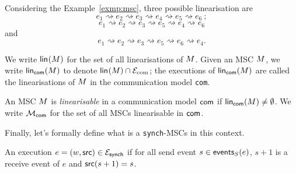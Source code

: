 

\bigskip

\begin{example}\label{exmp:lin}
Considering the Example~\ref{exmp:msc}, three possible linearisation
are 
$$e_1 \rightsquigarrow e_2 \rightsquigarrow e_3 \rightsquigarrow e_4
\rightsquigarrow e_5 \rightsquigarrow e_6\ ;$$
$$e_1 \rightsquigarrow e_2 \rightsquigarrow e_3 \rightsquigarrow e_5
\rightsquigarrow e_4 \rightsquigarrow e_6$$ and
$$e_1 \rightsquigarrow e_2 \rightsquigarrow e_3 \rightsquigarrow e_5
\rightsquigarrow e_6 \rightsquigarrow e_4.$$ 
\end{example}

We write $\mathsf{lin}_{}(M)$ for the set of all linearisations of $M$.
Given an MSC $M$, we write $\mathsf{lin}_{\mathsf{com}}(M)$ 
to denote $\mathsf{lin}_{}(M) \cap \mathcal{E}_{\text{com}}$;
the executions of $\mathsf{lin}_{\mathsf{com}}(M)$ 
are called the linearisations of $M$ in the communication model \verb|com|.

\bigskip
	
\begin{definition}\label{def:linearisable-msc}
	An MSC $M$ is \textit{linearisable} in a communication model $\mathsf{com}$
	if $\mathsf{lin}_{\mathsf{com}}(M)\neq\emptyset$.
	We write $\mathcal{M}_{\mathsf{com}}$ for the set of all MSCs 
	linearisable in $\mathsf{com}$.
\end{definition}

Finally, let's formally define what is a \verb|synch|-MSCs in this context.

\bigskip

\begin{definition}\label{def:synch}
	An execution $e=(w,\mathsf{src}) \in \mathcal{E}_{\mathsf{synch}}$
	if for all send event $s\in\mathsf{events}_S(e)$, $s+1$ is a receive event
	of $e$ and $\mathsf{src}(s+1)=s$.
\end{definition}


